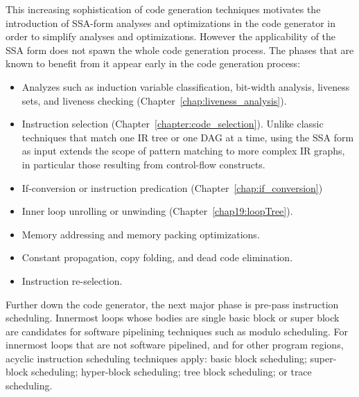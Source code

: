 This increasing sophistication of code generation techniques motivates the
introduction of SSA-form analyses and optimizations in the code generator in
order to simplify analyses and optimizations. However the applicability of the SSA
form does not spawn the whole code generation process. The phases that are known
to benefit from it appear early in the code generation process:
\begin{itemize}

\item Analyzes such as induction variable classification, bit-width analysis,
liveness sets, and liveness checking (Chapter~\ref{chap:liveness_analysis}).

\item Instruction selection (Chapter~\ref{chapter:code_selection}). Unlike
classic techniques that match one IR tree or one DAG at a time, using the SSA
form as input extends the scope of pattern matching to more complex IR graphs,
in particular those resulting from control-flow constructs.

\item If-conversion or instruction predication (Chapter~\ref{chap:if_conversion})

\item Inner loop unrolling or unwinding (Chapter~\ref{chap19:loopTree}).

\item Memory addressing and memory packing optimizations.

\item Constant propagation, copy folding, and dead code elimination.

\item Instruction re-selection.

\end{itemize}

Further down the code generator, the next major phase is pre-pass instruction
scheduling. Innermost loops whose bodies are single basic block or super
block are candidates for software pipelining techniques such as modulo
scheduling. For innermost loops that are not software pipelined, and for other
program regions, acyclic instruction scheduling techniques apply: basic block
scheduling; super-block scheduling; hyper-block scheduling; tree block
scheduling; or trace scheduling.

